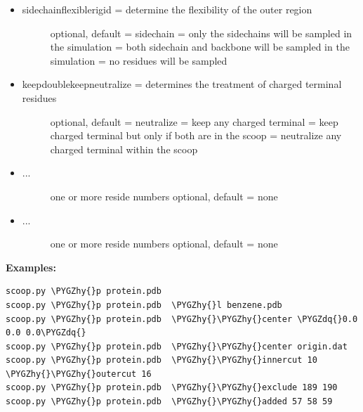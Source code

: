 \documentclass[letterpaper,10pt,english]{sphinxmanual}
\def\PYGZhy{\char`\-}
\def\PYGZdq{\char`\"}
\begin{document}
\begin{itemize}
\begin{description}
\end{description}

\item {} \begin{description}
\item[{ sidechain\textbar{}flexible\textbar{}rigid = determine the flexibility of the outer region}] \leavevmode
optional, default = sidechain
 = only the sidechains will be sampled in the simulation
 = both sidechain and backbone will be sampled in the simulation
 = no residues will be sampled

\end{description}

\item {} \begin{description}
\item[{ keep\textbar{}doublekeep\textbar{}neutralize = determines the treatment of charged terminal residues}] \leavevmode
optional, default = neutralize
 = keep any charged terminal
 = keep charged terminal but only if both are in the scoop
 = neutralize any charged terminal within the scoop

\end{description}

\item {} \begin{description}
\item[{ ...}] \leavevmode
one or more reside numbers
optional, default = none

\end{description}

\item {} \begin{description}
\item[{ ...}] \leavevmode
one or more reside numbers
optional, default = none

\end{description}

\end{itemize}

\textbf{Examples:}

\begin{Verbatim}[frame=single,commandchars=\\\{\}]
scoop.py \PYGZhy{}p protein.pdb
scoop.py \PYGZhy{}p protein.pdb  \PYGZhy{}l benzene.pdb
scoop.py \PYGZhy{}p protein.pdb  \PYGZhy{}\PYGZhy{}center \PYGZdq{}0.0 0.0 0.0\PYGZdq{}
scoop.py \PYGZhy{}p protein.pdb  \PYGZhy{}\PYGZhy{}center origin.dat
scoop.py \PYGZhy{}p protein.pdb  \PYGZhy{}\PYGZhy{}innercut 10 \PYGZhy{}\PYGZhy{}outercut 16
scoop.py \PYGZhy{}p protein.pdb  \PYGZhy{}\PYGZhy{}exclude 189 190
scoop.py \PYGZhy{}p protein.pdb  \PYGZhy{}\PYGZhy{}added 57 58 59
\end{Verbatim}
\end{document}
